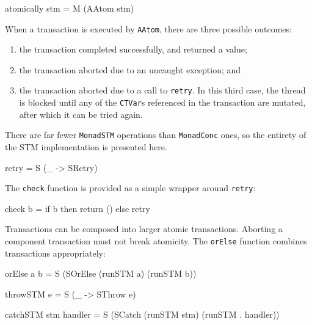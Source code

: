 \begin{haskellcode}
atomically stm = M (AAtom stm)
\end{haskellcode}


When a transaction is executed by \verb|AAtom|, there are three
possible outcomes:

\begin{enumerate}
\item the transaction completed successfully, and returned a value;

\item the transaction aborted due to an uncaught exception; and

\item the transaction aborted due to a call to \verb|retry|. In this
  third case, the thread is blocked until any of the \verb|CTVar|s
  referenced in the transaction are mutated, after which it can be
  tried again.
\end{enumerate}

There are far fewer \verb|MonadSTM| operations than \verb|MonadConc|
ones, so the entirety of the STM implementation is presented here.

\begin{haskellcode}
retry = S (\_ -> SRetry)
\end{haskellcode}


The \verb|check| function is provided as a simple wrapper around
\verb|retry|:

\begin{haskellcode}
check b = if b then return () else retry
\end{haskellcode}

Transactions can be composed into larger atomic transactions. Aborting
a component transaction must not break atomicity. The \verb|orElse|
function combines transactions appropriately:

\begin{haskellcode}
orElse a b = S (SOrElse (runSTM a) (runSTM b))
\end{haskellcode}


\begin{haskellcode}
throwSTM e = S (\_ -> SThrow e)

catchSTM stm handler = S (SCatch (runSTM stm) (runSTM . handler))
\end{haskellcode}

